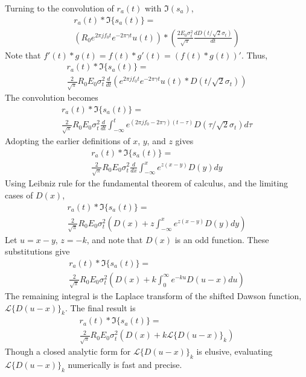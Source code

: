 \documentclass[amsmath,amssymb,aps,prd,10pt,twocolumn,showkeys]{revtex4}
\begin{document}
Turning to the convolution of $r_a(t)$ with $\Im(s_a)$,
\begin{multline}
r_a(t) * \Im\lbrace s_a(t) \rbrace = \\ \left(R_0 e^{2\pi j f_0 t} e^{-2\pi \gamma t} u(t)\right) * \left(\frac{2 E_0 \sigma_t^2}{\sqrt{\pi}}\frac{dD(t/\sqrt{2}\sigma_t)}{dt} \right)
\end{multline}
Note that $f'(t) * g(t) = f(t) * g'(t) = (f(t) * g(t))'$.  Thus,
\begin{multline}
r_a(t) * \Im\lbrace s_a(t) \rbrace = \\ \frac{2}{\sqrt{\pi}} R_0 E_0 \sigma_t^2 \frac{d}{dt}\left(e^{2\pi j f_0 t}e^{-2\pi\gamma t} u(t) * D(t/\sqrt{2}\sigma_t) \right)
\end{multline}
The convolution becomes
\begin{multline}
r_a(t) * \Im\lbrace s_a(t) \rbrace = \\ \frac{2}{\sqrt{\pi}} R_0 E_0 \sigma_t^2 \frac{d}{dt} \int_{-\infty}^{t} e^{(2\pi j f_0 - 2\pi\gamma)(t-\tau)}D(\tau/\sqrt{2}\sigma_t)d\tau
\end{multline}
Adopting the earlier definitions of $x$, $y$, and $z$ gives
\begin{multline}
r_a(t) * \Im\lbrace s_a(t) \rbrace = \\ \frac{2}{\sqrt{\pi}} R_0 E_0 \sigma_t^2 \frac{d}{dx} \int_{-\infty}^{x} e^{z(x-y)} D(y) dy
\end{multline}
Using Leibniz rule for the fundamental theorem of calculus, and the limiting cases of $D(x)$, 
\begin{multline}
r_a(t) * \Im\lbrace s_a(t) \rbrace = \\ \frac{2}{\sqrt{\pi}} R_0 E_0 \sigma_t^2 \left(D(x) + z\int_{-\infty}^{x} e^{z(x-y)} D(y) dy \right)
\end{multline}
Let $u = x-y$, $z=-k$, and note that $D(x)$ is an odd function.  These substitutions give
\begin{multline}
r_a(t) * \Im\lbrace s_a(t) \rbrace = \\ \frac{2}{\sqrt{\pi}} R_0 E_0 \sigma_t^2 \left(D(x) + k\int_{0}^{\infty} e^{-ku} D(u-x) du \right)
\end{multline}
The remaining integral is the Laplace transform of the shifted Dawson function, $\mathcal{L}\lbrace D(u-x)\rbrace_k$.  The final result is
\begin{multline}
r_a(t) * \Im\lbrace s_a(t) \rbrace = \\ \frac{2}{\sqrt{\pi}} R_0 E_0 \sigma_t^2 \left(D(x) + k\mathcal{L}\lbrace D(u-x)\rbrace_k\right) \label{eq:Im_result}
\end{multline}
Though a closed analytic form for $\mathcal{L}\lbrace D(u-x)\rbrace_k$ is elusive, evaluating $\mathcal{L}\lbrace D(u-x)\rbrace_k$ numerically is fast and precise.
\end{document}

